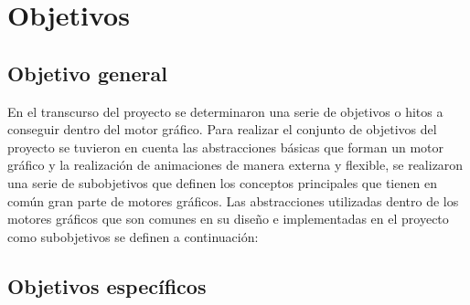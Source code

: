 \documentclass[a4paper, 17pt]{book}
\begin{document}
  
  
  


\cleardoublepage
\chapter{Objetivos}
\label{chap:objetivos}

\section{Objetivo general}
\label{sec:objetivo-general}

En el transcurso del proyecto se determinaron una serie de objetivos o hitos a conseguir dentro del motor gráfico. 
Para realizar el conjunto de objetivos del proyecto se tuvieron en cuenta las abstracciones básicas que forman
un motor gráfico y la realización de animaciones de manera externa y flexible, se realizaron una serie de
subobjetivos que definen los conceptos principales que tienen en común gran parte de motores gráficos.
Las abstracciones utilizadas dentro de los motores gráficos que son comunes en su diseño e implementadas
en el proyecto como subobjetivos se definen a continuación:

\section{Objetivos específicos}
\label{sec:objetivos-especificos}
\end{document}
